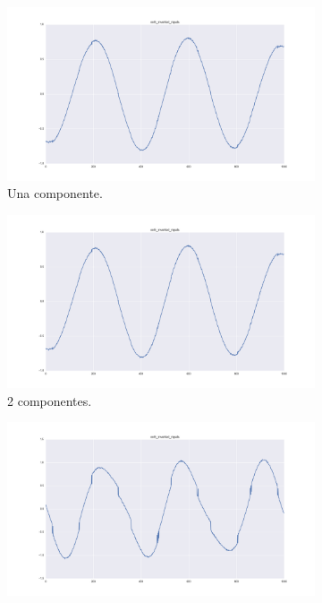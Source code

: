 \documentclass[11pt,spanish,listoffigures,listoftables]{tfgetsinf}
\begin{document}
        \begin{figure}[H]
            \begin{subfigure}[h]{0.33\textwidth}
                \centering
                \includegraphics[width=\textwidth]{simulated_data_8_columns/col5_inverted_nipals_1.png}
                \caption{Una componente.}
                \label{fig:col5_inverted_nipals1}
            \end{subfigure}
            \begin{subfigure}[h]{0.33\textwidth}
                \centering
                \includegraphics[width=\textwidth]{simulated_data_8_columns/col5_inverted_nipals_2.png}
                \caption{2 componentes.}
                \label{fig:col5_inverted_nipals2}
            \end{subfigure}
            \begin{subfigure}[h]{0.33\textwidth}
                \centering
                \includegraphics[width=\textwidth]{simulated_data_8_columns/col5_inverted_nipals_3.png}

\end{subfigure}
\end{figure}
\end{document}
